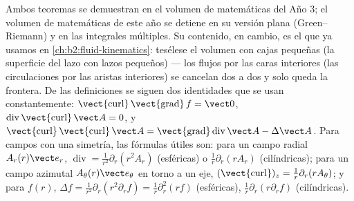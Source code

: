 \begin{remark}\label{rem:b2:maxwell-equations:whyadmitted}
Ambos teoremas se demuestran en el volumen de matemáticas del Año 3; el
volumen de matemáticas de este año se detiene en su versión plana
(Green--Riemann) y en las integrales múltiples. Su contenido, en cambio,
es el que ya usamos en \cref{ch:b2:fluid-kinematics}: tesélese el volumen
con cajas pequeñas (la superficie del lazo con lazos pequeños) --- los
flujos por las caras interiores (las circulaciones por las aristas
interiores) se cancelan dos a dos y solo queda la frontera. De las
definiciones se siguen dos identidades que se usan constantemente:
$\operatorname{\vect{curl}}\operatorname{\vect{grad}}f = \vect 0$,
$\operatorname{div}\operatorname{\vect{curl}}\vect A = 0$, y
$\operatorname{\vect{curl}}\operatorname{\vect{curl}}\vect A = \operatorname{\vect{grad}}
\operatorname{div}\vect A - \Delta\vect A$. Para campos con una simetría, las
fórmulas útiles son: para un campo radial $A_r(r)\vect e_r$, $\operatorname{div}
= \frac1{r^2}\partial_r(r^2A_r)$ (esféricas) o $\frac1r\partial_r(rA_r)$
(cilíndricas); para un campo azimutal $A_\theta(r)\vect e_\theta$ en torno a un
eje, $(\operatorname{\vect{curl}})_z = \frac1r\partial_r(rA_\theta)$; y para $f(r)$,
$\Delta f = \frac1{r^2}\partial_r(r^2\partial_rf) = \frac1r\partial_r^2(rf)$ (esféricas),
$\frac1r\partial_r(r\partial_rf)$ (cilíndricas).
\end{remark}

